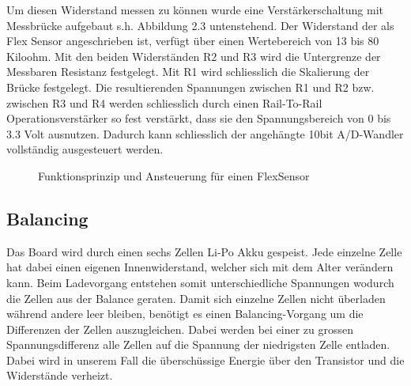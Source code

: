 Um diesen Widerstand messen zu können wurde eine Verstärkerschaltung mit Messbrücke aufgebaut s.h. Abbildung 2.3 untenstehend. Der Widerstand der als Flex Sensor angeschrieben ist, verfügt über einen Wertebereich von 13 bis 80 Kiloohm. Mit den beiden Widerständen R2 und R3 wird die Untergrenze der Messbaren Resistanz festgelegt. Mit R1 wird schliesslich die Skalierung der Brücke festgelegt. Die resultierenden Spannungen zwischen R1 und R2 bzw. zwischen R3 und R4 werden schliesslich durch einen Rail-To-Rail Operationsverstärker so fest verstärkt, dass sie den Spannungsbereich von 0 bis 3.3 Volt ausnutzen. Dadurch kann schliesslich der
angehängte 10bit A/D-Wandler vollständig ausgesteuert werden.
\begin{figure} [H]
	\centering

\caption[BLDC Motor]{Funktionsprinzip und Ansteuerung für einen FlexSensor}
\label{fig:BLDC}
\end{figure}
\subsection{Balancing}
\label{tGl_Balancing}
Das Board wird durch einen sechs Zellen Li-Po Akku gespeist. Jede einzelne Zelle hat dabei einen eigenen Innenwiderstand, welcher sich mit dem Alter verändern kann. Beim Ladevorgang entstehen somit unterschiedliche Spannungen wodurch die Zellen aus der Balance geraten.
Damit sich einzelne Zellen nicht überladen während andere leer bleiben, benötigt es einen Balancing-Vorgang um die Differenzen der Zellen auszugleichen. 
Dabei werden bei einer zu grossen Spannungsdifferenz alle Zellen auf die Spannung der niedrigsten Zelle entladen. Dabei wird in unserem Fall die überschüssige Energie über den Transistor und die Widerstände verheizt.

